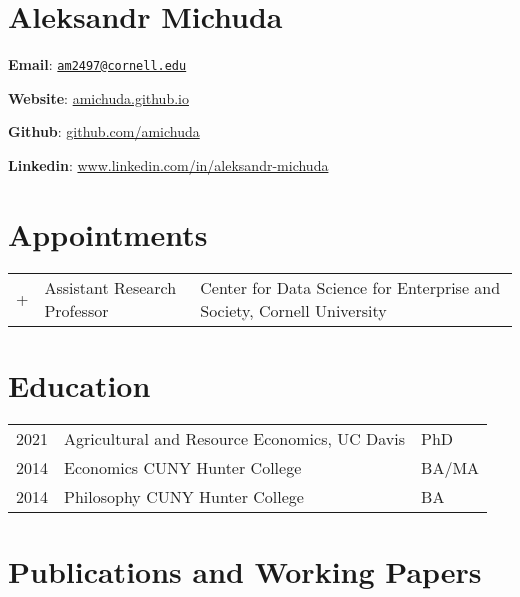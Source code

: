 \documentclass[
  11pt]{article}
\author{}
\date{}
\def\toprule{}
\def\bottomrule{}
\begin{document}
\hypertarget{aleksandr-michuda}{%
\section{Aleksandr Michuda}\label{aleksandr-michuda}}

\textbf{Email}:
\href{mailto:am2497@cornell.edu}{\nolinkurl{am2497@cornell.edu}}

\textbf{Website}: \href{https://amichuda.github.io}{amichuda.github.io}

\textbf{Github}: \href{https://github.com/amichuda}{github.com/amichuda}

\textbf{Linkedin}:
\href{https://www.linkedin.com/in/aleksandr-michuda}{www.linkedin.com/in/aleksandr-michuda}

\hypertarget{appointments}{%
\section{Appointments}\label{appointments}}

\begin{longtable}[]{@{}
  >{\raggedright\arraybackslash}p{}
  >{\raggedright\arraybackslash}p{}
  >{\raggedright\arraybackslash}p{}@{}}
\toprule
\endhead
2021+ & Assistant Research Professor & Center for Data Science for
Enterprise and Society, Cornell University \\
\bottomrule
\end{longtable}

\hypertarget{education}{%
\section{Education}\label{education}}

\begin{longtable}[]{@{}lll@{}}
\toprule
\endhead
2021 & Agricultural and Resource Economics, UC Davis & PhD \\
2014 & Economics CUNY Hunter College & BA/MA \\
2014 & Philosophy CUNY Hunter College & BA \\
\bottomrule
\end{longtable}

\hypertarget{publications-and-working-papers}{%
\section{Publications and Working
Papers}\label{publications-and-working-papers}}
\end{document}
